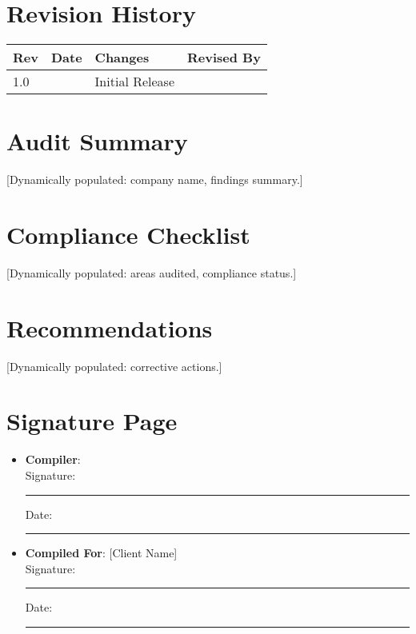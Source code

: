 \documentclass[11pt]{article}
\newcommand{\issueDate}{}
\newcommand{\compilerName}{}
\begin{document}
\section{Revision History}
\begin{tabularx}{\textwidth}{lXll}
  \toprule
  \textbf{Rev} & \textbf{Date} & \textbf{Changes} & \textbf{Revised By} \\
  \midrule
  1.0 & \issueDate & Initial Release & \compilerName \\
  \bottomrule
\end{tabularx}

\section{Audit Summary}
[Dynamically populated: company name, findings summary.]

\section{Compliance Checklist}
[Dynamically populated: areas audited, compliance status.]

\section{Recommendations}
[Dynamically populated: corrective actions.]

\section{Signature Page}
\begin{itemize}
  \item \textbf{Compiler}: \compilerName \\
    Signature: \rule{5cm}{0.4pt} \quad Date: \rule{3cm}{0.4pt}
  \item \textbf{Compiled For}: [Client Name] \\
    Signature: \rule{5cm}{0.4pt} \quad Date: \rule{3cm}{0.4pt}
\end{itemize}
\end{document}
